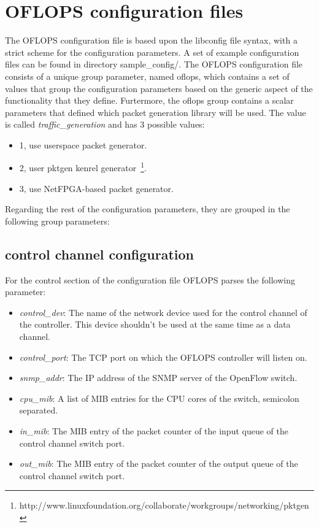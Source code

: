 \documentclass{book}
\begin{document}
\section{OFLOPS configuration files}
\label{oflops-config-lang}

The OFLOPS configuration file is based upon the libconfig file syntax, with 
a strict scheme for the configuration parameters. A set of example configuration 
files can be found in directory sample\_config/. The OFLOPS configuration file 
consists of a unique group parameter, named oflops, which contains a set 
of values that group the configuration parameters based on the generic aspect
of the functionality that they define. Furtermore, the oflops group contains a 
scalar parameters that defined which packet generation library will be used. The value is called 
\emph{traffic\_generation} and has 3 possible values: 
\begin{itemize}
  \item 1, use userspace packet generator.
  \item 2, user pktgen kenrel generator~\footnote{http://www.linuxfoundation.org/collaborate/workgroups/networking/pktgen}.
  \item 3, use NetFPGA-based packet generator. 
\end{itemize}
Regarding the rest of the configuration parameters, they are grouped in 
the following group parameters: 

\subsection{control channel configuration}
For the control section of the configuration file OFLOPS parses the following parameter:
\begin{itemize}
\item \emph{control\_dev}: The name of the network device used for the control channel of 
the controller. This device shouldn't be used at the same time as a data channel. 
\item \emph{control\_port}: The TCP port on which the OFLOPS controller will listen on.
\item \emph{snmp\_addr}: The IP address of the SNMP server of the OpenFlow switch.
\item \emph{cpu\_mib}: A list of MIB entries for the CPU cores of the switch, semicolon 
separated.
\item \emph{in\_mib}: The MIB entry of the packet counter of the input queue of the control 
channel switch port. 
\item \emph{out\_mib}: The MIB entry of the packet counter of the output queue of the control 
channel switch port.
\end{itemize} 
\end{document}

